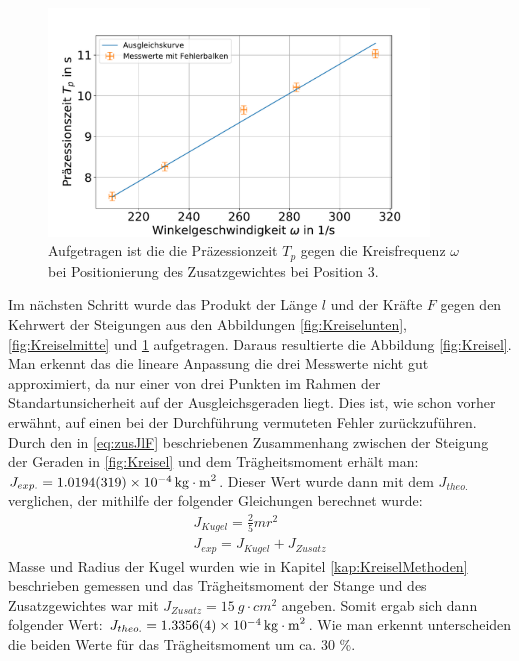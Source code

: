\begin{figure}[h]
	\centering
	\includegraphics[width=0.9\textwidth]{res/sproHzoben.pdf}
	\caption{Aufgetragen ist die die Präzessionzeit $T_p$ gegen die Kreisfrequenz $\omega$ bei Positionierung des Zusatzgewichtes bei Position 3.}
		\label{fig:Kreiseloben}
	\end{figure}
Im nächsten Schritt wurde das Produkt der Länge $l$ und der Kräfte $F$ gegen den Kehrwert der Steigungen aus den Abbildungen  \ref{fig:Kreiselunten}, \ref{fig:Kreiselmitte} und \ref{fig:Kreiseloben} aufgetragen. 
Daraus resultierte die Abbildung \ref{fig:Kreisel}.
Man erkennt das die lineare Anpassung die drei Messwerte nicht gut approximiert, da nur einer von drei Punkten im Rahmen der Standartunsicherheit auf der Ausgleichsgeraden liegt. Dies ist, wie schon vorher erwähnt, auf einen bei der Durchführung vermuteten Fehler zurückzuführen.
Durch den in \ref{eq:zusJlF} beschriebenen Zusammenhang zwischen der Steigung der Geraden in \cref{fig:Kreisel} und dem Trägheitsmoment erhält man:  $J_{exp.}=\SI{1,0194+-0,0319e-4}{kg \cdot m^2}$. 
Dieser Wert wurde dann mit dem $J_{theo.}$ verglichen, der mithilfe der folgender Gleichungen berechnet wurde:
\begin{align}
	J_{Kugel}=\frac{2}{5}mr^2\\
	J_{exp}=J_{Kugel}+J_{Zusatz}
	\label{eq:J}
\end{align}
Masse und Radius der Kugel wurden wie in Kapitel \ref{kap:KreiselMethoden} beschrieben gemessen und das Trägheitsmoment der Stange und des Zusatzgewichtes war mit $J_{Zusatz}=\SI{15}{g \cdot cm^2}$ angeben. Somit ergab sich dann folgender Wert: $J_{theo.}=\SI{1,3356+-0,0004e-4}{kg \cdot m^2}$. Wie man erkennt unterscheiden die beiden Werte für das Trägheitsmoment um ca. 30 \%.
